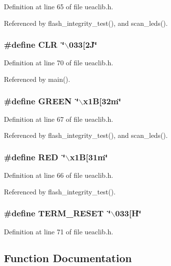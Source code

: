 Definition at line 65 of file ueaclib.h.

Referenced by flash\_\-integrity\_\-test(), and scan\_\-leds().
\subsubsection{\setlength{\rightskip}{0pt plus 5cm}\#define CLR~\char`\"{}$\backslash$033[2J\char`\"{}}\label{ueaclib_8h_a4}




Definition at line 70 of file ueaclib.h.

Referenced by main().
\subsubsection{\setlength{\rightskip}{0pt plus 5cm}\#define GREEN~\char`\"{}$\backslash$x1B[32m\char`\"{}}\label{ueaclib_8h_a2}




Definition at line 67 of file ueaclib.h.

Referenced by flash\_\-integrity\_\-test(), and scan\_\-leds().
\subsubsection{\setlength{\rightskip}{0pt plus 5cm}\#define RED~\char`\"{}$\backslash$x1B[31m\char`\"{}}\label{ueaclib_8h_a1}




Definition at line 66 of file ueaclib.h.

Referenced by flash\_\-integrity\_\-test().
\subsubsection{\setlength{\rightskip}{0pt plus 5cm}\#define TERM\_\-RESET~\char`\"{}$\backslash$033[H\char`\"{}}\label{ueaclib_8h_a5}




Definition at line 71 of file ueaclib.h.

\subsection{Function Documentation}
